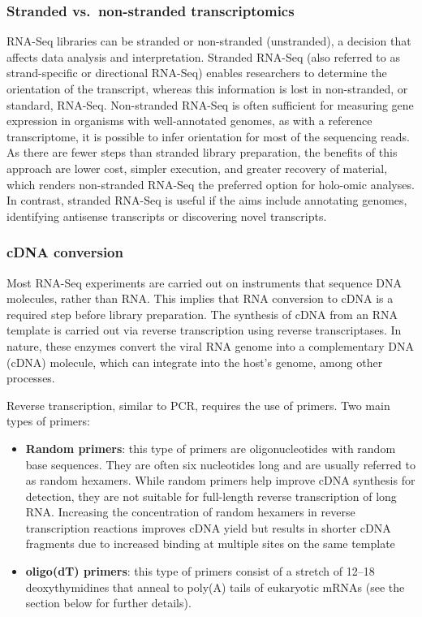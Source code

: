 \documentclass[
]{book}
\begin{document}
\hypertarget{stranded-transcriptomics}{%
\subsubsection*{Stranded vs.~non-stranded transcriptomics}\label{stranded-transcriptomics}}

RNA-Seq libraries can be stranded or non-stranded (unstranded), a decision that affects data analysis and interpretation. Stranded RNA-Seq (also referred to as strand-specific or directional RNA-Seq) enables researchers to determine the orientation of the transcript, whereas this information is lost in non-stranded, or standard, RNA-Seq. Non-stranded RNA-Seq is often sufficient for measuring gene expression in organisms with well-annotated genomes, as with a reference transcriptome, it is possible to infer orientation for most of the sequencing reads. As there are fewer steps than stranded library preparation, the benefits of this approach are lower cost, simpler execution, and greater recovery of material, which renders non-stranded RNA-Seq the preferred option for holo-omic analyses. In contrast, stranded RNA-Seq is useful if the aims include annotating genomes, identifying antisense transcripts or discovering novel transcripts.

\hypertarget{cDNA-conversion}{%
\subsubsection*{cDNA conversion}\label{cDNA-conversion}}

Most RNA-Seq experiments are carried out on instruments that sequence DNA molecules, rather than RNA. This implies that RNA conversion to cDNA is a required step before library preparation. The synthesis of cDNA from an RNA template is carried out via reverse transcription using reverse transcriptases. In nature, these enzymes convert the viral RNA genome into a complementary DNA (cDNA) molecule, which can integrate into the host's genome, among other processes.

Reverse transcription, similar to PCR, requires the use of primers. Two main types of primers:

\begin{itemize}
\item
  \textbf{Random primers}: this type of primers are oligonucleotides with random base sequences. They are often six nucleotides long and are usually referred to as random hexamers. While random primers help improve cDNA synthesis for detection, they are not suitable for full-length reverse transcription of long RNA. Increasing the concentration of random hexamers in reverse transcription reactions improves cDNA yield but results in shorter cDNA fragments due to increased binding at multiple sites on the same template
\item
  \textbf{oligo(dT) primers}: this type of primers consist of a stretch of 12--18 deoxythymidines that anneal to poly(A) tails of eukaryotic mRNAs (see the section below for further details).
\end{itemize}
\end{document}

